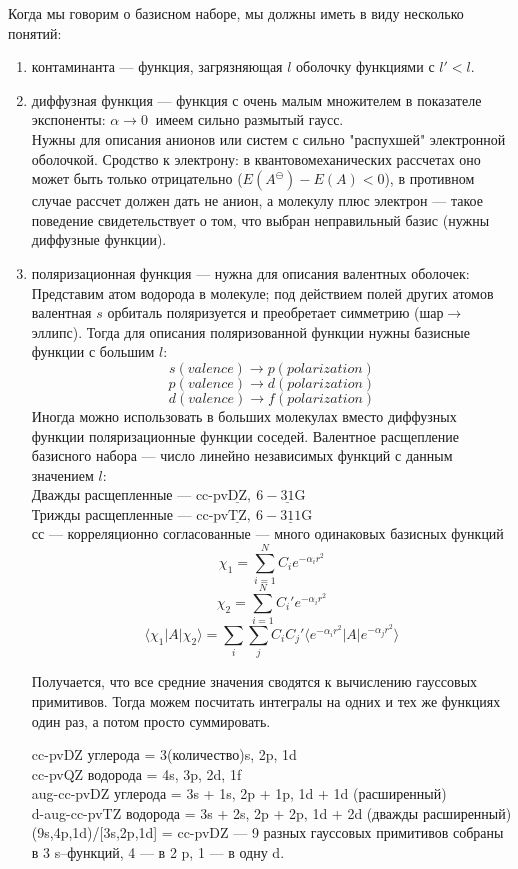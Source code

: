 \documentclass[a4paper,14pt]{extarticle}
\begin{document}
Когда мы говорим о базисном наборе, мы должны иметь в виду несколько понятий:
\begin{enumerate}

\item контаминанта --- функция, загрязняющая $l$ оболочку функциями с $l' < l$.

\item диффузная функция --- функция с очень малым множителем в показателе экспоненты:
$ \alpha \rightarrow 0 \ \text{ имеем сильно размытый гаусс. }$ \\ 
Нужны для описания анионов или систем с сильно "распухшей" электронной оболочкой.
Сродство к электрону:
в квантовомеханических рассчетах оно может быть только отрицательно ($E(A^{\ominus}) - E(A) < 0$),
в противном случае рассчет должен дать не анион, а молекулу плюс электрон --- такое поведение свидетельствует о том, 
что выбран неправильный базис (нужны диффузные функции).

\item поляризационная функция --- нужна для описания валентных оболочек:
Представим атом водорода в молекуле; 
под действием полей других атомов валентная $s$ орбиталь поляризуется и преобретает симметрию (шар$\rightarrow$ эллипс).
Тогда для описания поляризованной функции нужны базисные функции с большим $l$:
$$s (valence) \rightarrow p (polarization)$$
$$p (valence) \rightarrow d (polarization)$$
$$d (valence) \rightarrow f (polarization)$$
Иногда можно использовать в больших молекулах вместо диффузных функции поляризационные функции соседей.
Валентное расщепление базисного набора --- число линейно независимых функций с данным значением $l$:\\
Дважды расщепленные --- cc-pv$\underline{\text{DZ}},\ 6-\underline{31}$G\\
Трижды расщепленные --- cc-pv$\underline{\text{TZ}},\ 6-\underline{311}$G\\
сс --- корреляционно согласованные --- много одинаковых базисных функций
$$\chi_1 = \sum_{i=1} ^ N C_i e^{-\alpha_i r^2}$$
$$\chi_2 = \sum_{i=1} ^ N C_i' e^{-\alpha_i r^2}$$
$$\langle\chi_1|A|\chi_2\rangle = \sum_i\sum_j C_iC_j'\langle e^{-\alpha_i r^2}|A|e^{-\alpha_jr^2}\rangle$$

Получается, что все средние значения сводятся к вычислению гауссовых примитивов. 
Тогда можем посчитать интегралы на одних и тех же функциях один раз, а потом просто суммировать.

cc-pvDZ углерода = 3(количество)s, 2p, 1d\\
cc-pvQZ водорода = 4s, 3p, 2d, 1f\\
aug-cc-pvDZ углерода = 3s + 1s, 2p + 1p, 1d + 1d (расширенный)\\
d-aug-cc-pvTZ водорода = 3s + 2s, 2p + 2p, 1d + 2d (дважды расширенный)\\
(9s,4p,1d)/[3s,2p,1d] = cc-pvDZ --- 9 разных гауссовых примитивов собраны в 3 s--функций, 4 --- в 2 p, 1 --- в одну d.


\end{enumerate}
\end{document}
